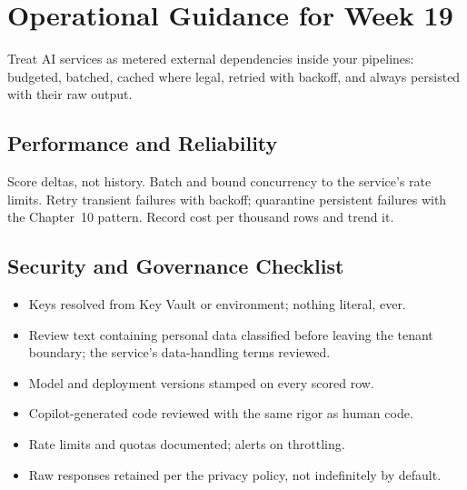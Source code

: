 \section{Operational Guidance for Week 19}
Treat AI services as metered external dependencies inside your pipelines: budgeted, batched, cached where legal, retried with backoff, and always persisted with their raw output.

\subsection{Performance and Reliability}
Score deltas, not history. Batch and bound concurrency to the service's rate limits. Retry transient failures with backoff; quarantine persistent failures with the Chapter~10 pattern. Record cost per thousand rows and trend it.

\subsection{Security and Governance Checklist}
\begin{itemize}
    \item Keys resolved from Key Vault or environment; nothing literal, ever.
    \item Review text containing personal data classified before leaving the tenant boundary; the service's data-handling terms reviewed.
    \item Model and deployment versions stamped on every scored row.
    \item Copilot-generated code reviewed with the same rigor as human code.
    \item Rate limits and quotas documented; alerts on throttling.
    \item Raw responses retained per the privacy policy, not indefinitely by default.
\end{itemize}

